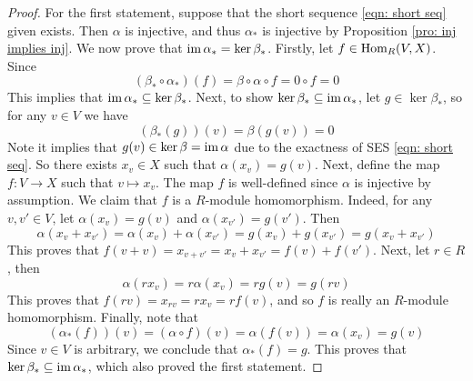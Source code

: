 \begin{proof}
    For the first statement, suppose that the short sequence \ref{eqn: short seq} given exists. Then $\alpha$ is injective, and thus $\alpha_*$ is injective by Proposition \ref{pro: inj implies inj}. We now prove that $\operatorname{im} \alpha_* = \ker \beta_*$. Firstly, let $f\in \operatorname{Hom}_R(V,X)$. Since 
    \[(\beta_*\circ \alpha_*)(f) = \beta \circ \alpha \circ f = 0 \circ f = 0\]
    This implies that $\operatorname{im}\alpha_*\subseteq \ker\beta_*$. Next, to show $\ker\beta_*\subseteq \operatorname{im} \alpha_*$, let $g\in \ker \beta_*$, so for any $v\in V$ we have
    \[(\beta_*(g))(v) = \beta(g(v))=0\]
    Note it implies that $g(v) \in \ker \beta = \operatorname{im}\alpha$ due to the exactness of SES \ref{eqn: short seq}. So there exists $x_v\in X$ such that $\alpha(x_v) = g(v)$. Next, define the map $f:V\to X$ such that $v\mapsto x_v$. The map $f$ is well-defined since $\alpha$ is injective by assumption. We claim that $f$ is a $R$-module homomorphism. Indeed, for any $v,v'\in V$, let $\alpha(x_v) = g(v)$ and $\alpha(x_{v'}) = g(v')$. Then 
    \[\alpha(x_v + x_{v'}) = \alpha(x_v) + \alpha(x_{v'}) = g(x_v) + g(x_{v'}) = g(x_v + x_{v'}) \]
    This proves that $f(v+v) = x_{v+v'} = x_v + x_{v'} = f(v) + f(v')$. Next, let $r\in R$, then 
    \[\alpha(rx_v) = r\alpha(x_v) = rg(v) = g(rv)\]
    This proves that $f(rv) = x_{rv} = rx_v = rf(v)$, and so $f$ is really an $R$-module homomorphism. Finally, note that
    \[(\alpha_*(f))(v) = (\alpha\circ f) (v) = \alpha(f(v)) = \alpha(x_v) = g(v)\]
    Since $v\in V$ is arbitrary, we conclude that $\alpha_*(f)=g$. This proves that $\ker\beta_*\subseteq \operatorname{im} \alpha_*$, which also proved the first statement.


\end{proof}
